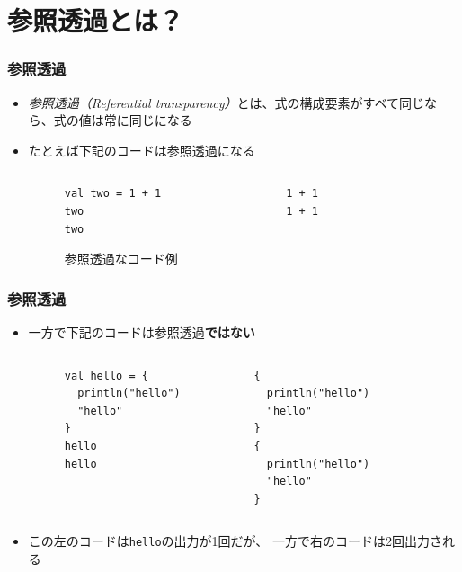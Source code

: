 \section{参照透過とは？}

\begin{frame}[fragile]
  \frametitle{参照透過}

  \begin{itemize}
    \item<+-> \emph{参照透過（Referential transparency）}とは、式の構成要素がすべて同じなら、式の値は常に同じになる\cite{referential_transparency_def}

    \item<+-> たとえば下記のコードは参照透過になる
    \begin{figure}[h]
      \begin{columns}
        \begin{column}{0.4\textwidth}
\begin{lstlisting}[style=scala]
val two = 1 + 1
two
two
\end{lstlisting}
      \end{column}
      \begin{column}{0.4\textwidth}
\begin{lstlisting}[style=scala]
1 + 1
1 + 1
\end{lstlisting}
        \end{column}
      \end{columns}
      \label{fig:lst_referential_transparency}
      \caption{参照透過なコード例}
    \end{figure}

  \end{itemize}
\end{frame}

\begin{frame}[fragile]
  \frametitle{参照透過}

  \begin{itemize}
    \item<+-> 一方で下記のコードは参照透過\textbf{ではない}
    \begin{figure}[h]
      \begin{columns}
        \begin{column}{0.4\textwidth}
\begin{lstlisting}[style=scala]
val hello = {
  println("hello")
  "hello"
}
hello
hello
\end{lstlisting}
        \end{column}
        \begin{column}{0.4\textwidth}
\begin{lstlisting}[style=scala]
{
  println("hello")
  "hello"
}
{
  println("hello")
  "hello"
}
\end{lstlisting}
        \end{column}
      \end{columns}
    \end{figure}

    \item<+-> この左のコードは\lstinline|hello|の出力が1回だが、
    一方で右のコードは2回出力される
  \end{itemize}
\end{frame}

